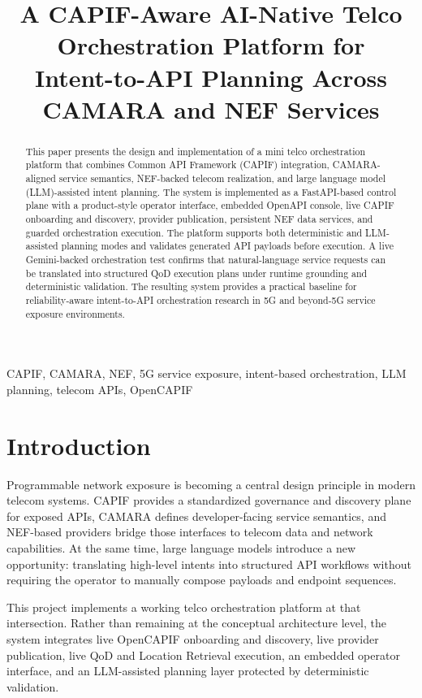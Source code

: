 \documentclass[conference]{IEEEtran}
\title{A CAPIF-Aware AI-Native Telco Orchestration Platform for\\Intent-to-API Planning Across CAMARA and NEF Services}
\author{
\IEEEauthorblockN{T\"urkan Do\u{g}a Durak}
\IEEEauthorblockA{
CTTC Internship Project\\
Barcelona, Spain\\
\texttt{turkan.doga.durak@example.com}
}
}
\begin{document}
\maketitle

\begin{abstract}
This paper presents the design and implementation of a mini telco orchestration platform that combines Common API Framework (CAPIF) integration, CAMARA-aligned service semantics, NEF-backed telecom realization, and large language model (LLM)-assisted intent planning. The system is implemented as a FastAPI-based control plane with a product-style operator interface, embedded OpenAPI console, live CAPIF onboarding and discovery, provider publication, persistent NEF data services, and guarded orchestration execution. The platform supports both deterministic and LLM-assisted planning modes and validates generated API payloads before execution. A live Gemini-backed orchestration test confirms that natural-language service requests can be translated into structured QoD execution plans under runtime grounding and deterministic validation. The resulting system provides a practical baseline for reliability-aware intent-to-API orchestration research in 5G and beyond-5G service exposure environments.
\end{abstract}

\begin{IEEEkeywords}
CAPIF, CAMARA, NEF, 5G service exposure, intent-based orchestration, LLM planning, telecom APIs, OpenCAPIF
\end{IEEEkeywords}

\section{Introduction}

Programmable network exposure is becoming a central design principle in modern telecom systems. CAPIF provides a standardized governance and discovery plane for exposed APIs, CAMARA defines developer-facing service semantics, and NEF-based providers bridge those interfaces to telecom data and network capabilities. At the same time, large language models introduce a new opportunity: translating high-level intents into structured API workflows without requiring the operator to manually compose payloads and endpoint sequences.

This project implements a working telco orchestration platform at that intersection. Rather than remaining at the conceptual architecture level, the system integrates live OpenCAPIF onboarding and discovery, live provider publication, live QoD and Location Retrieval execution, an embedded operator interface, and an LLM-assisted planning layer protected by deterministic validation.
\end{document}
